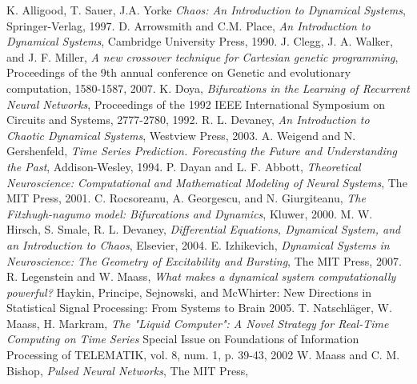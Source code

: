 \documentclass[12pt]{article}
\begin{document}
\begin{thebibliography}{widest-label}
 K. Alligood, T. Sauer, J.A. Yorke
 \emph{Chaos:  An Introduction to Dynamical Systems},
 Springer-Verlag, 
 1997.
 D. Arrowsmith and C.M. Place,
 \emph{An Introduction to Dynamical Systems},
 Cambridge University Press,
 1990.
 J. Clegg, J. A. Walker, and J. F. Miller,
 \emph{A new crossover technique for Cartesian genetic programming},
 Proceedings of the 9th annual conference on Genetic and evolutionary computation,
 1580-1587,
 2007.
 K. Doya,
 \emph{Bifurcations in the Learning of Recurrent Neural Networks},
 Proceedings of the 1992 IEEE International Symposium on Circuits and Systems,
 2777-2780,
 1992.
 R. L. Devaney,
 \emph{An Introduction to Chaotic Dynamical Systems},
 Westview Press,
 2003.
 A. Weigend and N. Gershenfeld,
 \emph{Time Series Prediction.  Forecasting the Future and Understanding the Past},
 Addison-Wesley,
 1994.
 P. Dayan and L. F. Abbott,
 \emph{Theoretical Neuroscience:  Computational and Mathematical Modeling of Neural Systems},
 The MIT Press,
 2001.
 C. Rocsoreanu, A. Georgescu, and N. Giurgiteanu,
 \emph{The Fitzhugh-nagumo model:  Bifurcations and Dynamics},
 Kluwer,
 2000.
 M. W. Hirsch, S. Smale, R. L. Devaney,
 \emph{Differential Equations, Dynamical System, and an Introduction to Chaos},
 Elsevier,
 2004.
 E. Izhikevich,
 \emph{Dynamical Systems in Neuroscience:  The Geometry of Excitability and Bursting},
 The MIT Press,
 2007.
 R. Legenstein and W. Maass,
 \emph{What makes a dynamical system computationally powerful?}
 Haykin, Principe, Sejnowski, and McWhirter:
 New Directions in Statistical Signal Processing:  From Systems to Brain
 2005.
 T. Natschl\"ager, W. Maass, H. Markram,
 \emph{The "Liquid Computer":  A Novel Strategy for Real-Time Computing on Time Series}
  Special Issue on Foundations of Information Processing of TELEMATIK, 
  vol. 8, 
  num. 1, 
  p. 39-43,
  2002 
 W. Maass and C. M. Bishop,
 \emph{Pulsed Neural Networks},
 The MIT Press,

\end{thebibliography}
\end{document}
